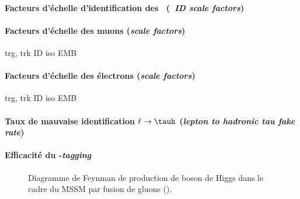 \paragraph{Facteurs d'échelle d'identification des \tauh\ (\emph{\tauh\ ID scale factors})}

\paragraph{Facteurs d'échelle des muons (\emph{scale factors})} trg, trk ID iso EMB

\paragraph{Facteurs d'échelle des électrons (\emph{scale factors})} trg, trk ID iso EMB

\paragraph{Taux de mauvaise identification $\ell\to\tauh$ (\emph{lepton to hadronic tau fake rate})}

\paragraph{Efficacité du \quarkb-\emph{tagging}}

\begin{wrapfigure}{R}{5cm}
\centering
\vspace{\baselineskip}
\caption[Production de boson de Higgs du MSSM par fusion de gluons.]{Diagramme de Feynman de production de boson de Higgs dans le cadre du MSSM par fusion de gluons (\gluon\gluon\Higgs).}
\label{fig-chapter-HTT_analysis-section-corrections-fgraph-gg_loop_hHA}
\end{wrapfigure}
